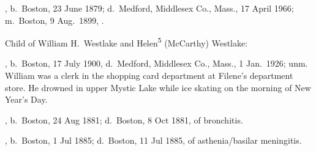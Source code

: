 \begin{Kids}
	, b.\ Boston, 23 June 1879;\cite{Helen5McCarthyBirth} d.\ Medford, Middlesex Co., Mass., 17 April 1966;\cite{Helen5McCarthyDeath} m.\ Boston, 9 Aug.\ 1899, .\cite{Helen5McCarthyMarriage}

\begin{GrandkidsIntro}
	Child of William H.\ Westlake and Helen\textsuperscript{5} (McCarthy) Westlake:
\end{GrandkidsIntro}

\begin{Grandkids}
	, b.\ Boston, 17 July 1900,\cite{William5WestlakeBirth} d.\ Medford, Middlesex Co., Mass., 1 Jan.\ 1926; unm.\cite{William5WestlakeDeath:1} William was a clerk in the shopping card department at Filene's department store. He drowned in upper Mystic Lake while ice skating on the morning of New Year's Day.\cite{William5WestlakeDeath:2}
\end{Grandkids}

	, b.\ Boston, 24 Aug 1881;\cite{John5McCarthyBirth} d.\ Boston, 8 Oct 1881, of bronchitis.\cite{John5McCarthyDeath}
	
	, b.\ Boston, 1 Jul 1885;\cite{William5McCarthyBirth} d.\ Boston, 11 Jul 1885, of asthenia/basilar meningitis.\cite{William5McCarthyDeath}

\end{Kids}


